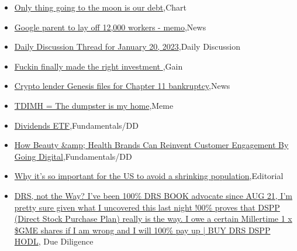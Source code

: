 \documentclass{article}%
\begin{document}
%
\begin{itemize}%
\item%
\href{https://reddit.com/r/wallstreetbets/comments/10gu8qz/only\_thing\_going\_to\_the\_moon\_is\_our\_debt/}{Only thing going to the moon is our debt},Chart%
\item%
\href{https://reddit.com/r/wallstreetbets/comments/10gu4jb/google\_parent\_to\_lay\_off\_12000\_workers\_memo/}{Google parent to lay off 12,000 workers - memo},News%
\item%
\href{https://reddit.com/r/wallstreetbets/comments/10gu3ib/daily\_discussion\_thread\_for\_january\_20\_2023/}{Daily Discussion Thread for January 20, 2023},Daily Discussion%
\item%
\href{https://reddit.com/r/wallstreetbets/comments/10gqw21/fuckin\_finally\_made\_the\_right\_investment/}{Fuckin finally made the right investment },Gain%
\item%
\href{https://reddit.com/r/wallstreetbets/comments/10gosly/crypto\_lender\_genesis\_files\_for\_chapter\_11/}{Crypto lender Genesis files for Chapter 11 bankruptcy},News%
\item%
\href{https://reddit.com/r/wallstreetbets/comments/10gndzu/tdimh\_the\_dumpster\_is\_my\_home/}{TDIMH = The dumpster is my home},Meme%
\item%
\href{https://reddit.com/r/StockMarket/comments/10gu7o0/dividends\_etf/}{Dividends ETF},Fundamentals/DD%
\item%
\href{https://reddit.com/r/StockMarket/comments/10gt3qi/how\_beauty\_health\_brands\_can\_reinvent\_customer/}{How Beauty \&amp; Health Brands Can Reinvent Customer Engagement By Going Digital},Fundamentals/DD%
\item%
\href{https://reddit.com/r/Economics/comments/10gmwby/why\_its\_so\_important\_for\_the\_us\_to\_avoid\_a/}{Why it's so important for the US to avoid a shrinking population},Editorial%
\item%
\href{https://reddit.com/r/Superstonk/comments/10gv4y3/drs\_not\_the\_way\_ive\_been\_100\_drs\_book\_advocate/}{DRS, not the Way? I've been 100\% DRS BOOK advocate since AUG 21, I'm pretty sure given what I uncovered this last night !00\% proves that DSPP (Direct Stock Purchase Plan) really is the way. I owe a certain Millertime 1 x \$GME shares if I am wrong and I will 100\% pay up | BUY DRS DSPP HODL}, Due Diligence%
\end{itemize}%
\end{document}
